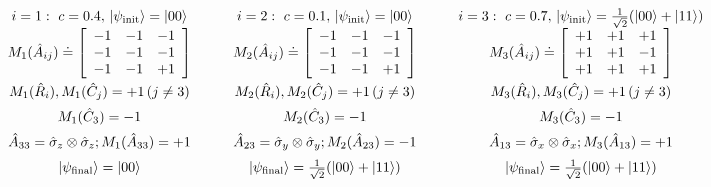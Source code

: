 \documentclass[british,aps,prl,superscriptaddress,nofootinbib,times,reprint]{revtex4-1}
\theoremstyle{plain}
\theoremstyle{plain}
\theoremstyle{definition}
\theoremstyle{remark}
\theoremstyle{remark}
\theoremstyle{remark}
\theoremstyle{plain}
\theoremstyle{plain}
\theoremstyle{plain}
\theoremstyle{definition}
\theoremstyle{definition}
\begin{document}
\begin{table}
 \begin{equation*}
\renewcommand{\arraystretch}{1.5}
\begin{array}{ccc} 
i=1:\,\, c=0.4,\,\left|\psi_{\text{init}}\right\rangle=\left|00\right\rangle
&
i=2:\,\, c=0.1,\,\left|\psi_{\text{init}}\right\rangle=\left|00\right\rangle
&
i=3:\,\, c=0.7,\,\left|\psi_{\text{init}}\right\rangle=\frac{1}{\sqrt{2}}
(\left|00\right\rangle
+\left|11\right\rangle) \\
\renewcommand{\arraystretch}{1}
M_{1}(\hat{A}_{ij})\doteq\left[\begin{array}{ccc} -1 & -1 & -1\\ -1 & -1 & -1\\ -1 & -1 & +1\end{array}\right] &
\renewcommand{\arraystretch}{1}
M_{2}(\hat{A}_{ij})\doteq\left[\begin{array}{ccc}-1 & -1 & -1\\ -1 & -1 & -1\\ -1 & -1 & +1\end{array}\right] &
\renewcommand{\arraystretch}{1}
M_{3}(\hat{A}_{ij})\doteq\left[\begin{array}{ccc}+1
& +1 & +1\\ +1 & +1 & -1\\ +1 & +1 &
+1\end{array}\right] \\
M_{1}(\hat{R}_{i}), M_{1}(\hat{C}_{j})=+1\,(j\neq3) &
M_{2}(\hat{R}_{i}), M_{2}(\hat{C}_{j})=+1\,(j\neq3) &
M_{3}(\hat{R}_{i}), M_{3}(\hat{C}_{j})=+1\,(j\neq3)\\
M_{1}(\hat{C}_{3})=-1 & M_{2}(\hat{C}_{3})=-1 & M_{3}(\hat{C}_{3})=-1\\ 
\hat{A}_{33}=\hat{\sigma}_{z}\otimes\hat{\sigma}_{z};M_{1}(\hat{A}_{33})=+1&
\quad\quad\hat{A}_{23}=\hat{\sigma}_{y}\otimes\hat{\sigma}_{y};M_{2}(\hat{A}_{23})=-1\quad\quad&
\hat{A}_{13}=\hat{\sigma}_{x}\otimes\hat{\sigma}_{x};M_{3}(\hat{A}_{13})=+1\\
\left|\psi_{\text{final}}\right\rangle =
\left|00\right\rangle  &
\left|\psi_{\text{final}}\right\rangle =
\frac{1}{\sqrt{2}}(\left|00\right\rangle
+\left|11\right\rangle) &
\left|\psi_{\text{final}}\right\rangle =
\frac{1}{\sqrt{2}}(\left|00\right\rangle+\left|11\right\rangle)


\end{array}
\end{equation*}
\end{table}
\end{document}
